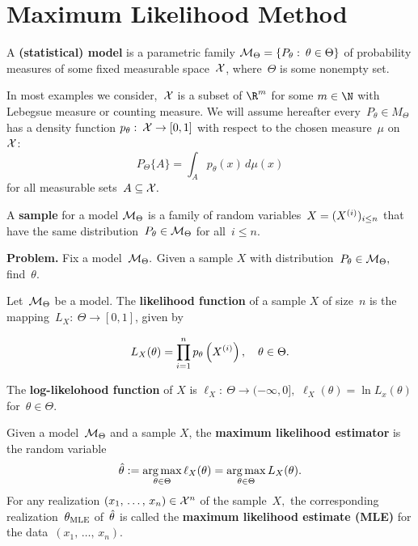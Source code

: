 \documentclass{article}
\begin{document}
  \section{Maximum Likelihood Method}
  \begin{definition}
    A \textbf{(statistical) model} is a parametric family \(\mathcal{M}_\Theta = \{P_\theta:\:\theta\in \Theta\}\) of probability measures of some fixed measurable space~\(\mathcal{X}\), where~\(\Theta\) is some nonempty set.
  \end{definition}
  In most examples we consider,~\(\mathcal{X} \) is a subset of \( \R^m\) for some \(m \in\N\) with Lebegsue measure or counting measure. We will assume hereafter every~\(P_\theta\in M_\Theta \) has a density function \(p_\theta:\:\mathcal{X}\to [0,1]\) with respect to the chosen measure~\(\mu\) on~\(\mathcal{X}\):
  \[
    P_\Theta\{A\} = \int_A p_\theta(x)\,d\mu(x)
  \]
  for all measurable sets~\(A \subseteq \mathcal{X}.\) 

  \begin{definition}
    A \textbf{sample} for a model \(\mathcal{M}_\Theta\) is a family of random variables~\(X = (X^{(i)})_{i \le n}\) that have the same distribution~\(P_\theta\in \mathcal{M}_\Theta\) for all~\(i \le n.\)
  \end{definition}

  \noindent\textbf{Problem.} Fix a model~\(\mathcal{M}_\Theta.\) Given a sample \(X\) with distribution~\(P_\theta\in\mathcal{M}_\Theta,\) find~\(\theta\).

  \begin{definition}
    Let~\(\mathcal{M}_\Theta\) be a model. The \textbf{likelihood function} of a sample \(X\) of size~\(n\) is the mapping~\(L_X:\:\Theta \to [0,1]\), given by
    
    \[
      L_X(\theta) = \prod_{i=1}^n p_\theta\left(X^{(i)}\right),\quad \theta\in \Theta.
    \]

    The \textbf{log-likelohood function} of \(X\) is \(\ell_X:\: \Theta \to (-\infty,0],\) \(\ell_X(\theta) = \ln L_x(\theta)\) for~\(\theta\in \Theta.\)

  \end{definition}

  \begin{definition}
    Given a model~\(\mathcal{M}_\Theta\) and a sample \(X\), the \textbf{maximum likelihood estimator} is the random variable
    \[
      \hat\theta := \operatorname*{arg\,max}_{\theta\in \Theta} \ell_X(\theta) = \operatorname*{arg\,max}_{\theta\in \Theta} L_X(\theta).
    \]
    For any realization \((x_1,\,\ldots,\,x_n) \in \mathcal{X}^n\) of the sample~\(X,\) the corresponding realization~\(\theta_{\text{MLE}}\) of~\(\hat\theta\) is called the \textbf{maximum likelihood estimate (MLE)} for the data~\((x_1,\,\ldots,\,x_n).\)
  \end{definition}
\end{document}
